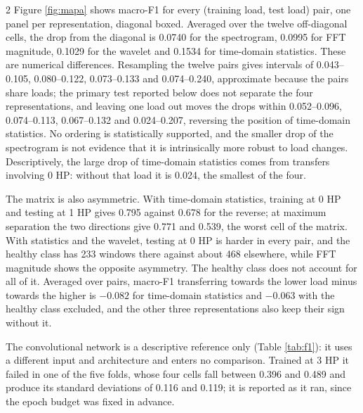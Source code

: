 \documentclass[12pt,twoside,titlepage]{ingenius}
\begin{document}
\begin{multicols}{2}
Figure \ref{fig:mapa} shows macro-F1 for every (training load, test load) pair,
one panel per representation, diagonal boxed. Averaged over the twelve
off-diagonal cells, the drop from the diagonal is 0.0740 for the spectrogram,
0.0995 for FFT magnitude, 0.1029 for the wavelet and 0.1534 for time-domain
statistics. These are numerical differences. Resampling the twelve pairs gives intervals of 0.043--0.105, 0.080--0.122,
0.073--0.133 and 0.074--0.240, approximate because the pairs share loads; the
primary test reported below does not separate the four representations, and
leaving one load out moves the drops within 0.052--0.096, 0.074--0.113,
0.067--0.132 and 0.024--0.207, reversing the position of time-domain statistics.
No ordering is statistically supported, and the smaller drop
of the spectrogram is not evidence that it is intrinsically more robust to load
changes. Descriptively, the large drop of time-domain statistics comes from
transfers involving 0 HP: without that load it is 0.024, the smallest of the
four.



The matrix is also asymmetric. With time-domain statistics, training at 0 HP and
testing at 1 HP gives 0.795 against 0.678 for the reverse; at maximum separation
the two directions give 0.771 and 0.539, the worst cell of the matrix. With
statistics and the wavelet, testing at 0 HP is harder in every pair, and the
healthy class has 233 windows there against about 468 elsewhere, while FFT
magnitude shows the opposite asymmetry. The healthy class does not account for all of it. Averaged over pairs, macro-F1 transferring towards the lower load minus
towards the higher is $-0.082$ for time-domain statistics and $-0.063$ with the
healthy class excluded, and the other three representations also keep their sign
without it.

The convolutional network is a descriptive reference only (Table \ref{tab:f1}):
it uses a different input and architecture and enters no comparison. Trained at
3 HP it failed in one of the five folds, whose four cells fall between 0.396 and
0.489 and produce its standard deviations of 0.116 and 0.119; it is reported as
it ran, since the epoch budget was fixed in advance.

\end{multicols}
\end{document}

